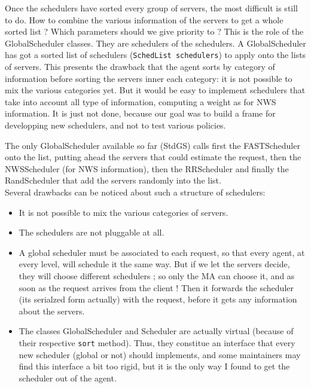   Once the schedulers have sorted every group of servers, the most difficult is
  still to do. How to combine the various information of the servers to get a
  whole sorted list ? Which parameters should we give priority to ? This is the
  role of the \textsf{GlobalScheduler} classes. They are schedulers of the
  schedulers. A \textsf{GlobalScheduler} has got a sorted list of schedulers
  (\texttt{SchedList schedulers}) to apply onto the lists of servers. This
  presents the drawback that the agent sorts by category of information before
  sorting the servers inner each category: it is not possible to mix the various
  categories yet. But it would be easy to implement schedulers that take into
  account all type of information, computing a weight as for NWS information. It
  is just not done, because our goal was to build a frame for developping new
  schedulers, and not to test various policies.

  The only \textsf{GlobalScheduler} available so far (\textsf{StdGS}) calls first
  the \textsf{FASTScheduler} onto the list, putting ahead the servers that could
  estimate the request, then the \textsf{NWSScheduler} (for NWS information), then
  the \textsf{RRScheduler} and finally the \textsf{RandScheduler} that add the
  servers randomly into the list.
  \\

  Several drawbacks can be noticed about such a structure of schedulers:
  \begin{itemize}
  \item It is not possible to mix the various categories of servers.
  \item The schedulers are not pluggable at all.
  \item A global scheduler must be associated to each request, so that every
  agent, at every level, will schedule it the same way. But if we let the
  servers decide, they will choose different schedulers ; so only the MA can
  choose it, and as soon as the request arrives from the client ! Then it
  forwards the scheduler (its serialzed form actually) with the request, before
  it gets any information about the servers.
  \item The classes \textsf{GlobalScheduler} and \textsf{Scheduler} are actually
  virtual (because of their respective \texttt{sort} method). Thus, they
  constitue an interface that every new scheduler (global or not) should
  implements, and some maintainers may find this interface a bit too rigid, but
  it is the only way I found to get the scheduler out of the agent.
  \end{itemize}

